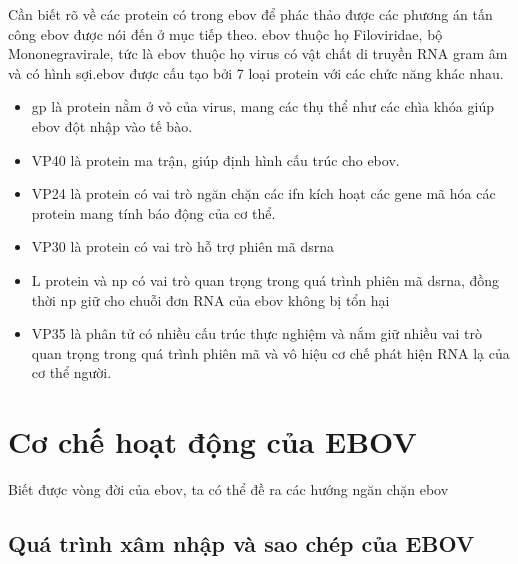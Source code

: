 \documentclass[12pt,a4paper,reqno, oneside]{book}
\begin{document}
	Cần biết rõ về các protein có trong \gls{ebov} để phác thảo được các phương án tấn công \gls{ebov} được nói đến ở mục tiếp theo.
	\Gls{ebov} thuộc họ Filoviridae, bộ Mononegravirale, tức là \gls{ebov} thuộc họ virus có vật chất di truyền RNA gram âm và có hình sợi\cite{Kuhn2010}.\Gls{ebov} được cấu tạo bởi 7 loại protein với các chức năng khác nhau\cite{Huang2002}.
	\begin{itemize}
	\item \gls{gp} là protein nằm ở vỏ của virus, mang các thụ thể như các chìa khóa giúp \gls{ebov} đột nhập vào tế bào\cite{Johnson2006, Lee2009}.
	\item VP40 là protein ma trận, giúp định hình cấu trúc cho \gls{ebov}\cite{Dessen2000, Noda2002}.
	\item VP24 là protein có vai trò ngăn chặn các \gls{ifn} kích hoạt các gene mã hóa các protein mang tính báo động của cơ thể\cite{Reid2006}.
	\item VP30 là protein có vai trò hỗ trợ phiên mã \gls{dsrna}\cite{Weik2002}
	\item L protein và \gls{np}\cite{Feldmann2003,Dziubanska:be5269} có vai trò quan trọng trong quá trình phiên mã \gls{dsrna}, đồng thời \gls{np} giữ cho chuỗi đơn RNA của \gls{ebov} không bị tổn hại\cite{Dziubanska:be5269}
	\item VP35 là phân tử có nhiều cấu trúc thực nghiệm và nắm giữ nhiều vai trò quan trọng trong quá trình phiên mã và vô hiệu cơ chế phát hiện RNA lạ của cơ thể người\cite{Muhlberger1999,Basler2000,Basler2003,Enterlein2006,Feng2007,Prins2009}.
	\end{itemize}

\section{Cơ chế hoạt động của EBOV}
Biết được vòng đời của \gls{ebov}, ta có thể đề ra các hướng ngăn chặn \gls{ebov}
\subsection{Quá trình xâm nhập và sao chép của EBOV}
\end{document}
